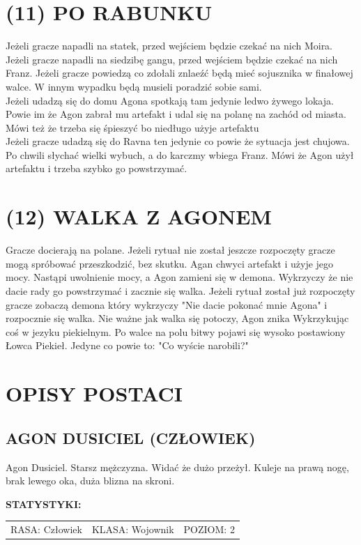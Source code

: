 \documentclass[14pt]{article}
\begin{document}
\section*{(11) PO RABUNKU}
\RaggedRight
Jeżeli gracze napadli na statek, przed wejściem będzie czekać na nich Moira. Jeżeli gracze napadli na siedzibę gangu, przed wejściem będzie czekać na nich Franz. Jeżeli gracze powiedzą co zdołali znlaeźć będą mieć sojusznika w finałowej walce. W innym wypadku będą musieli poradzić sobie sami. \\
Jeżeli udadzą się do domu Agona spotkają tam jedynie ledwo żywego lokaja. Powie im że Agon zabrał mu artefakt i udal się na polanę na zachód od miasta. Mówi też że trzeba się śpieszyć bo niedługo użyje artefaktu\\
Jeżeli gracze udadzą się do Ravna ten jedynie co powie że sytuacja jest chujowa. Po chwili słychać wielki wybuch, a do karczmy wbiega Franz. Mówi że Agon użył artefaktu i trzeba szybko go powstrzymać.

\Centering
\section*{(12) WALKA Z AGONEM}
\RaggedRight
Gracze docierają na polane. Jeżeli rytuał nie został jeszcze rozpoczęty gracze mogą spróbować przeszkodzić, bez skutku. Agan chwyci artefakt i użyje jego mocy. Nastąpi uwolnienie mocy, a Agon zamieni się w demona. Wykrzyczy że nie dacie rady go powstrzymać i zacznie się walka. Jeżeli rytuał został już rozpoczęty gracze zobaczą demona który wykrzyczy "Nie dacie pokonać mnie Agona" i rozpocznie się walka. Nie ważne jak walka się potoczy, Agon znika Wykrzykując coś w jezyku piekielnym. Po walce na polu bitwy pojawi się wysoko postawiony Łowca Piekieł. Jedyne co powie to: "Co wyście narobili?"

\newpage
\Centering
\section*{OPISY POSTACI}
\subsection*{AGON DUSICIEL (CZŁOWIEK)}
Agon Dusiciel. Starsz mężczyzna. Widać że dużo przeżył. Kuleje na prawą nogę, brak lewego oka, duża blizna na skroni.\\
\vspace{5mm}

\textbf{STATYSTYKI:} \\
\vspace{2mm}
\begin{tabularx}{\textwidth}{Y|Y|Y}
    \hline
    RASA: Człowiek & KLASA: Wojownik & POZIOM: 2 \\
\end{tabularx}
\end{document}
